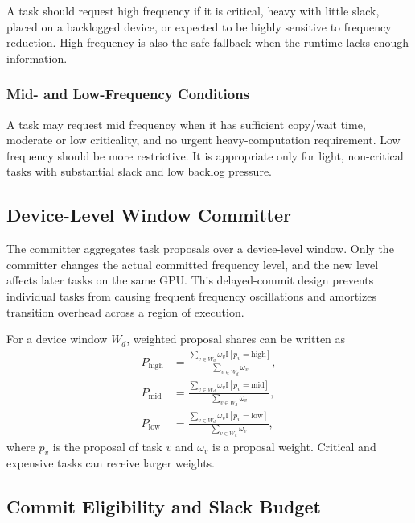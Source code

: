 A task should request high frequency if it is critical, heavy with little slack, placed on a backlogged device, or expected to be highly sensitive to frequency reduction. High frequency is also the safe fallback when the runtime lacks enough information.

\subsubsection{Mid- and Low-Frequency Conditions}
\label{subsubsec:mid_low_conditions}

A task may request mid frequency when it has sufficient copy/wait time, moderate or low criticality, and no urgent heavy-computation requirement. Low frequency should be more restrictive. It is appropriate only for light, non-critical tasks with substantial slack and low backlog pressure.

\subsection{Device-Level Window Committer}
\label{subsec:device_window_committer}

The committer aggregates task proposals over a device-level window. Only the committer changes the actual committed frequency level, and the new level affects later tasks on the same GPU. This delayed-commit design prevents individual tasks from causing frequent frequency oscillations and amortizes transition overhead across a region of execution.

For a device window $W_d$, weighted proposal shares can be written as
\begin{align}
P_{\mathrm{high}} &= \frac{\sum_{v \in W_d} \omega_v \mathbb{I}[p_v=\mathrm{high}]}{\sum_{v \in W_d} \omega_v}, \\
P_{\mathrm{mid}} &= \frac{\sum_{v \in W_d} \omega_v \mathbb{I}[p_v=\mathrm{mid}]}{\sum_{v \in W_d} \omega_v}, \\
P_{\mathrm{low}} &= \frac{\sum_{v \in W_d} \omega_v \mathbb{I}[p_v=\mathrm{low}]}{\sum_{v \in W_d} \omega_v},
\label{eq:proposal_shares}
\end{align}
where $p_v$ is the proposal of task $v$ and $\omega_v$ is a proposal weight. Critical and expensive tasks can receive larger weights.

\subsection{Commit Eligibility and Slack Budget}
\label{subsec:commit_eligibility}


